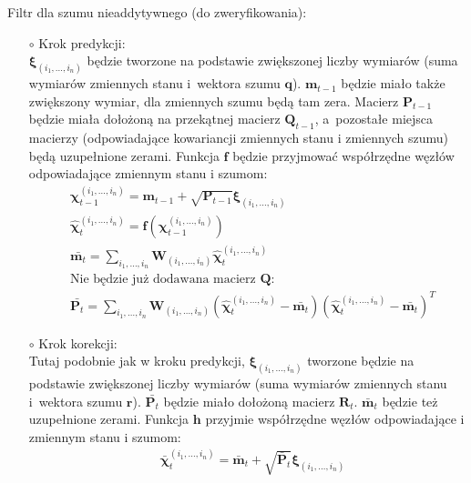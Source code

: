 Filtr dla szumu nieaddytywnego (do zweryfikowania):
\begin{itemize}
	\item[$\circ$] Krok predykcji:\\
	$\boldsymbol{\xi}_{(i_1, \dots, i_n)}$ będzie tworzone na podstawie zwiększonej liczby wymiarów (suma wymiarów zmiennych stanu i~wektora szumu $\boldsymbol{q}$). $\boldsymbol{m}_{t-1}$ będzie miało także zwiększony wymiar, dla zmiennych szumu będą tam zera.
	Macierz $\boldsymbol{P}_{t-1}$ będzie miała dołożoną na przekątnej macierz $\boldsymbol{Q}_{t-1}$, a~pozostałe miejsca macierzy (odpowiadające kowariancji zmiennych stanu i zmiennych szumu) będą uzupełnione zerami. Funkcja $\boldsymbol{f}$ będzie przyjmować współrzędne węzłów odpowiadające zmiennym stanu i szumom:
	\begin{align}\label{eq:GHKFNonAdditivePrediction}
	&\boldsymbol{\chi}^{(i_1, \dots, i_n)}_{t-1}=\boldsymbol{m}_{t-1}+\sqrt{\boldsymbol{P}_{t-1}}\boldsymbol{\xi}_{(i_1, \dots, i_n)} \nonumber \\
	&\hat{\boldsymbol{\chi}}^{(i_1, \dots, i_n)}_{t}=\boldsymbol{f}(\boldsymbol{\chi}^{(i_1, \dots, i_n)}_{t-1}) \nonumber \\
	&\bar{\boldsymbol{m}_t}=\sum_{i_1,\dots,i_n} \boldsymbol{W}_{(i_1, \dots, i_n)} \hat{\boldsymbol{\chi}}^{(i_1, \dots, i_n)}_{t} \nonumber \\
	&\text{Nie będzie już dodawana macierz $\boldsymbol{Q}$:} \nonumber \\
	&\bar{\boldsymbol{P}_t}=\sum_{i_1,\dots,i_n} \boldsymbol{W}_{(i_1, \dots, i_n)}(\hat{\boldsymbol{\chi}}^{(i_1, \dots, i_n)}_{t} - \bar{\boldsymbol{m}_t})(\hat{\boldsymbol{\chi}}^{(i_1, \dots, i_n)}_{t} - \bar{\boldsymbol{m}_t})^T
	\end{align}
	\item[$\circ$] Krok korekcji:\\
	Tutaj podobnie jak w kroku predykcji, $\boldsymbol{\xi}_{(i_1, \dots, i_n)}$ tworzone będzie na podstawie zwiększonej liczby wymiarów (suma wymiarów zmiennych stanu i~wektora szumu $\boldsymbol{r}$). $\bar{\boldsymbol{P}_t}$ będzie miało dołożoną macierz $\boldsymbol{R}_{t}$. $\bar{\boldsymbol{m}}_{t}$ będzie też uzupełnione zerami. Funkcja $\boldsymbol{h}$ przyjmie współrzędne węzłów odpowiadające i zmiennym stanu i szumom:
	\begin{align} \label{eq:GHKFNonAdditiveCorrection}
	&\bar{\boldsymbol{\chi}}^{(i_1, \dots, i_n)}_{t} = \bar{\boldsymbol{m}}_{t} + \sqrt{\bar{\boldsymbol{P}}_{t}} \boldsymbol{\xi}_{(i_1, \dots, i_n)} \nonumber \\

\end{align}
\end{itemize}
